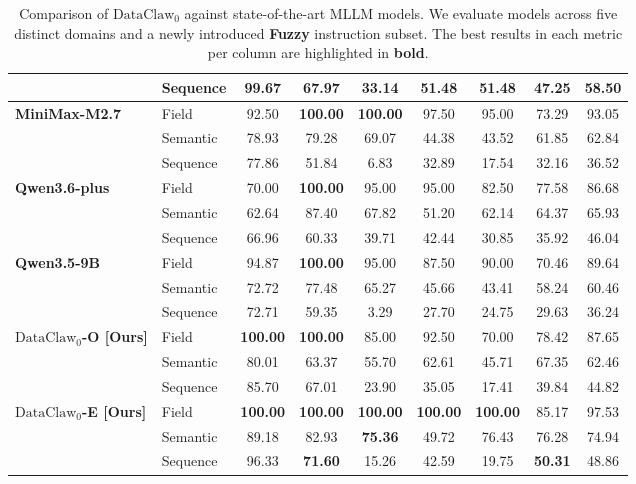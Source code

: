 \documentclass{llmxive}
\begin{document}
\begin{table}[t]
{\begin{tabular}{llccccccc}
& Sequence    & \textbf{99.67} & 67.97 & 33.14 & \textbf{51.48} & 51.48 & 47.25 & \textbf{58.50} \\
\midrule
\multirow{3}{*}{\textbf{MiniMax-M2.7}} 
& Field       & 92.50 & \textbf{100.00} & \textbf{100.00} & 97.50 & 95.00 & 73.29 & 93.05 \\
& Semantic    & 78.93 & 79.28 & 69.07 & 44.38 & 43.52 & 61.85 & 62.84 \\
& Sequence    & 77.86 & 51.84 & 6.83 & 32.89 & 17.54 & 32.16 & 36.52 \\
\midrule
\multirow{3}{*}{\textbf{Qwen3.6-plus}} 
& Field       & 70.00 & \textbf{100.00} & 95.00 & 95.00 & 82.50 & 77.58 & 86.68 \\
& Semantic    & 62.64 & 87.40 & 67.82 & 51.20 & 62.14 & 64.37 & 65.93 \\
& Sequence    & 66.96 & 60.33 & 39.71 & 42.44 & 30.85 & 35.92 & 46.04 \\
\midrule
\multirow{3}{*}{\textbf{Qwen3.5-9B}} 
& Field       & 94.87 & \textbf{100.00} & 95.00 & 87.50 & 90.00 & 70.46 & 89.64 \\
& Semantic    & 72.72 & 77.48 & 65.27 & 45.66 & 43.41 & 58.24 & 60.46 \\
& Sequence    & 72.71 & 59.35 & 3.29 & 27.70 & 24.75 & 29.63 & 36.24 \\
\midrule
\multirow{3}{*}{\textbf{$\text{DataClaw}_0$-O [Ours]}} 
& Field       & \textbf{100.00} & \textbf{100.00} & 85.00 & 92.50 & 70.00 & 78.42 & 87.65 \\
& Semantic    & 80.01 & 63.37 & 55.70 & 62.61 & 45.71 & 67.35 & 62.46 \\
& Sequence    & 85.70 & 67.01 & 23.90 & 35.05 & 17.41 & 39.84 & 44.82 \\
\midrule
\multirow{3}{*}{\textbf{$\text{DataClaw}_0$-E [Ours]}} 
& Field       & \textbf{100.00} & \textbf{100.00} & \textbf{100.00} & \textbf{100.00} & \textbf{100.00} & 85.17 & 97.53 \\
& Semantic    & 89.18 & 82.93 & \textbf{75.36} & 49.72 & 76.43 & 76.28 & 74.94 \\
& Sequence    & 96.33 & \textbf{71.60} & 15.26 & 42.59 & 19.75 & \textbf{50.31} & 48.86 \\
\bottomrule
\end{tabular}
}
\caption{Comparison of $\text{DataClaw}_0$ against state-of-the-art MLLM models. We evaluate models across five distinct domains and a newly introduced \textbf{Fuzzy} instruction subset. The best results in each metric per column are highlighted in \textbf{bold}.}
\label{tab:main_results}
\end{table}
\end{document}
